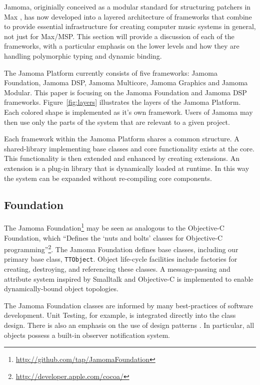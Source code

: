 \documentclass[twoside,10pt]{article}
\begin{document}
Jamoma, originially conceived as a modular standard for structuring patchers in Max \cite{Place:2006}, has now developed into a layered architecture of frameworks that combine to provide essential infrastructure for creating computer music systems in general, not just for Max/MSP. This section will provide a discussion of each of the frameworks, with a particular emphasis on the lower levels and how they are handling polymorphic typing and dynamic binding.

  
The Jamoma Platform currently consists of five frameworks: Jamoma Foundation, Jamoma DSP, Jamoma Multicore, Jamoma Graphics and Jamoma Modular. This paper is focusing on the Jamoma Foundation and Jamoma DSP frameworks. Figure~\ref{fig:layers} illustrates the layers of the Jamoma Platform.  Each colored shape is implemented as it's own framework. Users of Jamoma may then use only the parts of the system that are relevant to a given project.  

Each framework within the Jamoma Platform shares a common structure.  A shared-library implementing base classes and core functionality exists at the core.  This functionality is then extended and enhanced by creating extensions.  An extension is a plug-in library that is dynamically loaded at runtime.  In this way the system can be expanded without re-compiling core components.



\subsection{Foundation} %

The Jamoma Foundation\footnote{\url{http://github.com/tap/JamomaFoundation}} may be seen as analogous to the Objective-C Foundation, which ``Defines the `nuts and bolts' classes for Objective-C programming''\footnote{\url{http://developer.apple.com/cocoa/}}.  The Jamoma Foundation defines base classes, including our primary base class, \texttt{TTObject}.  Object life-cycle facilities include factories for creating, destroying, and referencing these classes.  A message-passing and attribute system inspired by Smalltalk and Objective-C is implemented to enable dynamically-bound object topologies.  

The Jamoma Foundation classes are informed by many best-practices of software development.  Unit Testing, for example, is integrated directly into the class design.  There is also an emphasis on the use of design patterns \cite{Gamma:1995}.  In particular, all objects possess a built-in observer notification system.  
\end{document}
